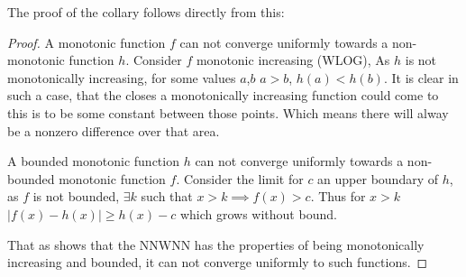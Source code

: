 \documentclass{article} %
\begin{document}
The proof of the collary  follows directly from this:
\begin{proof}
	A monotonic function $f$ can not converge uniformly towards a non-monotonic function $h$.
	Consider $f$ monotonic increasing (WLOG),
	As $h$ is not monotonically increasing, for some values $a$,$b$ $a>b$, 
	$h(a)<h(b)$.
	It is clear in such a case, that the closes a monotonically increasing function could come to this is to be some constant between those points.
	Which means there will alway be a nonzero difference over that area.

		
	
	A bounded monotonic function $h$ can not converge uniformly towards a non-bounded monotonic function $f$.
	Consider the limit for $c$ an upper boundary of $h$,
	as $f$ is not bounded, $\exists k$ such that $x>k \implies f(x)>c$.
	Thus for $x>k$ $|f(x)-h(x)|\ge h(x)-c$ which grows without bound.
	
	That as  shows that the NNWNN has the properties of being monotonically increasing and bounded, it can not converge uniformly to such functions.
\end{proof}
\end{document}
